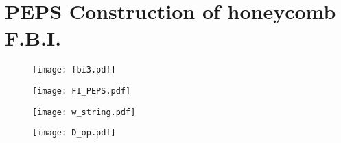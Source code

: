 
\section{PEPS Construction of honeycomb F.B.I.}
\begin{figure}[H]
	\centering
	\texttt{[image: fbi3.pdf]}
\end{figure}

\begin{figure}[H]
	\centering
	\texttt{[image: FI\_PEPS.pdf]}
\end{figure}

\begin{figure}[H]
	\centering
	\texttt{[image: w\_string.pdf]}
\end{figure}

\begin{figure}[H]
	\centering
	\texttt{[image: D\_op.pdf]}
\end{figure}